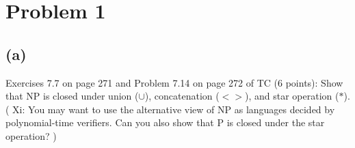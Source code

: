 \documentclass[twoside,11pt]{homework}
\date{\today} %
\begin{document}
\maketitle

\section*{Problem 1}
\subsection*{(a)}
\begin{prob}
  Exercises 7.7 on page 271 and Problem 7.14 on page 272 of TC (6 points):
  Show that NP is closed under union ($\cup$), concatenation ($<>$), and star
  operation ($*$).
  ( Xi: You may want to use the alternative view of NP as languages decided by
    polynomial-time verifiers.
    Can you also show that P is closed under the star operation?
  )
\end{prob}
\end{document}
